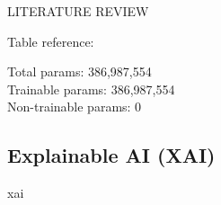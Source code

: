 \begin{section}[]{\uppercase{Literature Review}}
 

\vspace{2em}

Table reference:  \cite{Bhandari2023}
 \par \noindent Total params: 386,987,554 \\
 Trainable params: 386,987,554 \\
 Non-trainable params: 0

\subsection{Explainable AI (XAI)}
xai


\end{section}

\pagebreak